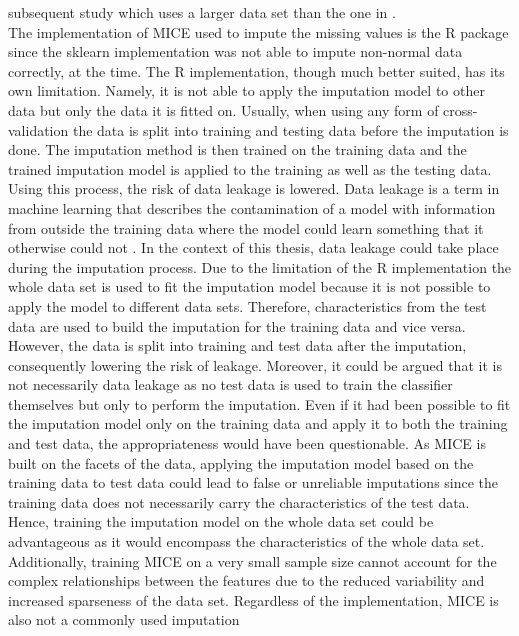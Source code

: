 subsequent study \cite{RN179} which uses a larger data set than the one in 
\cite{RN127}.
\\
The implementation of MICE used to impute the missing values is the R package 
 since the sklearn implementation was not able to impute 
non-normal data correctly, at the time. The R implementation, 
though much better suited, has its own limitation. Namely, it is not able to 
apply the imputation model to other data but only the data it is fitted on. 
Usually, when using any form of cross-validation the data is split into 
training and testing data before the imputation is done. The imputation method 
is then trained on the training data and the trained imputation model is 
applied to the training as well as the testing data. Using this process, the 
risk of data leakage is lowered.
Data leakage is a term in machine learning 
that describes the contamination of a model with information from outside the 
training data where the model could learn something that it otherwise could not 
\cite{RN199}.
In the context of this thesis, data leakage could take place during the 
imputation process. Due to the limitation of the R implementation the whole 
data set is used to fit the imputation model because it is not possible to 
apply the model to different data sets. Therefore, characteristics from the 
test data are used to build the imputation for the training data and vice 
versa. However, the data is split into training and test data after the 
imputation, consequently lowering the risk of leakage. Moreover, it could be 
argued that it is not necessarily data leakage as no test data is used to train 
the classifier themselves but only to perform the imputation.
Even if it had been possible to fit the imputation model only on the training 
data and apply it to both the training and test data, the appropriateness would 
have been questionable. As MICE is built on the facets of the data, applying 
the imputation model based on the training data to test data could lead to 
false or unreliable imputations since the training data does not necessarily 
carry the characteristics of the test data. Hence, training the imputation 
model on the whole data set could be advantageous as it would encompass the 
characteristics of the whole data set. Additionally, training MICE on a very 
small sample size cannot account for the complex relationships between the 
features due to the reduced variability and increased sparseness of the data 
set.
Regardless of the implementation, MICE is also not a commonly used imputation 
